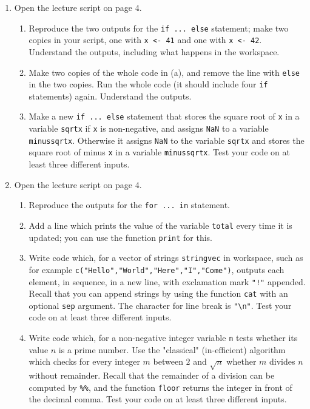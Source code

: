 \begin{enumerate}
\item Open the lecture script on page 4. 
\begin{enumerate}
\item Reproduce the two outputs for the \texttt{if ... else} statement; make two copies in your script, one with \texttt{x <- 41} and one with \texttt{x <- 42}. Understand the outputs, including what happens in the workspace.
\item Make two copies of the whole code in (a), and remove the line with \texttt{else} in the two copies. Run the whole code (it should include four \texttt{if} statements) again. Understand the outputs.
\item Make a new \texttt{if ... else} statement that stores the square root of \texttt{x} in a variable \texttt{sqrtx} if \texttt{x} is non-negative, and assigns \texttt{NaN} to a variable \texttt{minussqrtx}. Otherwise it assigns \texttt{NaN} to the variable \texttt{sqrtx} and stores the square root of minus \texttt{x} in a variable \texttt{minussqrtx}. Test your code on at least three different inputs.
\end{enumerate}

\item Open the lecture script on page 4. 
\begin{enumerate}
\item Reproduce the outputs for the \texttt{for ... in} statement.
\item Add a line which prints the value of the variable \texttt{total} every time it is updated; you can use the function \texttt{print} for this.
\item Write code which, for a vector of strings \texttt{stringvec} in workspace, such as for example \texttt{c("Hello","World","Here","I","Come")}, outputs each element, in sequence, in a new line, with exclamation mark \texttt{"!"} appended. Recall that you can append strings by using the function \texttt{cat} with an optional \texttt{sep} argument. The character for line break is \texttt{"\textbackslash n"}. Test your code on at least three different inputs.
\item Write code which, for a non-negative integer variable \texttt{n} tests whether its value $n$ is a prime number. Use the "classical" (in-efficient) algorithm which checks for every integer $m$ between $2$ and $\sqrt{n}$ whether $m$ divides $n$ without remainder. Recall that the remainder of a division can be computed by \texttt{\%\%}, and the function \texttt{floor} returns the integer in front of the decimal comma. Test your code on at least three different inputs.
\end{enumerate}



\end{enumerate}
